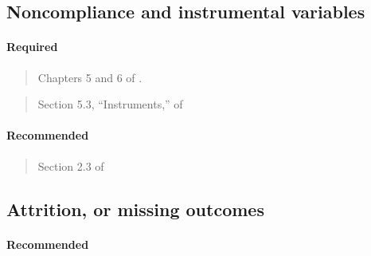 \documentclass[12pt]{article}
\begin{document}
\begin{verse}  \end{verse}

\subsection{Noncompliance and instrumental variables}

\paragraph*{Required}

\begin{verse} Chapters 5 and 6 of . \end{verse}

\begin{verse}
  Section 5.3, ``Instruments,'' of  \end{verse}

\begin{verse}
 \end{verse}

\paragraph*{Recommended}

\begin{verse} Section 2.3 of  \end{verse}

\begin{verse}  \end{verse}

\begin{verse}  \end{verse}

\begin{verse}  \end{verse}

\begin{verse}  \end{verse}

\subsection{Attrition, or missing outcomes}

\paragraph*{Recommended}
\end{document}
